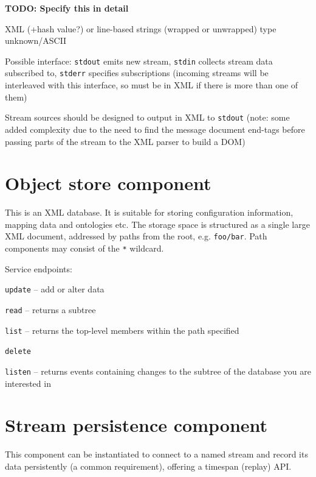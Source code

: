 \documentclass[12pt,a4paper,twoside]{article}
\renewcommand{\_}{\texttt{\symbol{95}}}
\newcommand{\todo}[1]{\textbf{TODO: #1}}
\begin{document}
\todo{Specify this in detail}

XML (+hash value?) or line-based strings (wrapped or unwrapped)
type unknown/ASCII

\begin{bulletlist}
\item Possible interface:
   \texttt{stdout} emits new stream, \texttt{stdin} collects stream
   data subscribed to, \texttt{stderr} specifies subscriptions
	(incoming streams will be interleaved with this interface, so must
	be in XML if there is more than one of them)

\item Stream sources should be designed to output in XML to \texttt{stdout}
   (note: some added complexity due to the need to find the
   message document end-tags before passing parts of the stream to the XML
   parser to build a DOM)
\end{bulletlist}

\section{Object store component}

This is an XML database. It is suitable for storing configuration
information, mapping data and ontologies etc.
The storage space is structured as a single large XML document,
addressed by paths from the root, e.g. \verb^foo/bar^.
Path components may consist of the \verb^*^ wildcard.

Service endpoints:
\begin{bulletlist}
\item \verb^update^ -- add or alter data
\item \verb^read^ -- returns a subtree
\item \verb^list^ -- returns the top-level members within the path specified
\item \verb^delete^
\item \verb^listen^ -- returns events containing changes to the subtree of
	the database you are interested in
\end{bulletlist}

\section{Stream persistence component}

This component can be instantiated to connect to a named stream and
record its data persistently (a common requirement), offering a
timespan (replay) API.
\end{document}
